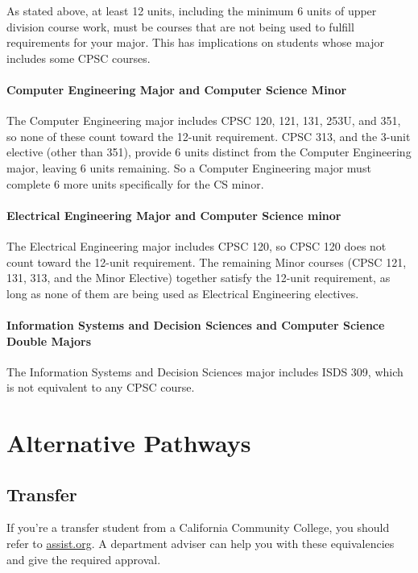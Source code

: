 \documentclass{book}
\begin{document}
As stated above, at least 12 units, including the minimum 6 units of
upper division course work, must be courses that are not being used to
fulfill requirements for your major. This has implications on students
whose major includes some CPSC courses.

\subsubsection{Computer Engineering Major and Computer Science Minor}

The Computer Engineering major includes CPSC 120, 121, 131, 253U, and
351, so none of these count toward the 12-unit requirement. CPSC 313,
and the 3-unit elective (other than 351), provide 6 units distinct
from the Computer Engineering major, leaving 6 units remaining. So a
Computer Engineering major must complete 6 more units specifically for
the CS minor.

\subsubsection{Electrical Engineering Major and Computer Science minor}

The Electrical Engineering major includes CPSC 120, so CPSC 120 does
not count toward the 12-unit requirement. The remaining Minor courses
(CPSC 121, 131, 313, and the Minor Elective) together satisfy the
12-unit requirement, as long as none of them are being used as
Electrical Engineering electives.

\subsubsection{Information Systems and Decision Sciences and Computer Science Double Majors}

The Information Systems and Decision Sciences major includes ISDS 309,
which is not equivalent to any CPSC course.
 
\chapter{Alternative Pathways}

\section{Transfer}

If you're a transfer student from a California Community College, you
should refer to \url{assist.org}. A department adviser can help you
with these equivalencies and give the required approval.
\end{document}
